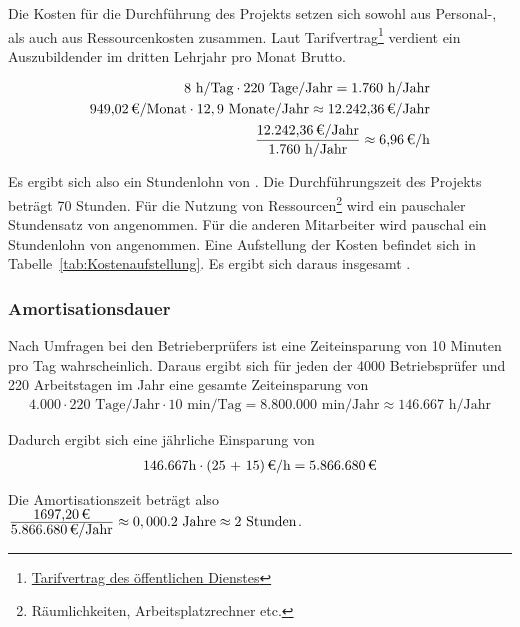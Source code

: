 Die Kosten für die Durchführung des Projekts setzen sich sowohl aus Personal-, als auch aus Ressourcenkosten zusammen.
Laut Tarifvertrag\footnote{\href{http://www.oeffentlichen-dienst.de/auszubildende/25-tarifvertrag-fuer-den-auszubildende/90-tvaoed-besonderer-teil-bbig.html}{Tarifvertrag des öffentlichen Dienstes}} verdient ein Auszubildender im dritten Lehrjahr pro Monat  Brutto. 

\begin{eqnarray}
8 \mbox{ h/Tag} \cdot 220 \mbox{ Tage/Jahr} = 1.760 \mbox{ h/Jahr}\\
\eur{949,02}\mbox{/Monat} \cdot 12,9 \mbox{ Monate/Jahr} \approx \eur{12.242,36} \mbox{/Jahr}\\
\frac{\eur{12.242,36} \mbox{/Jahr}}{1.760 \mbox{ h/Jahr}} \approx \eur{6,96}\mbox{/h}
\end{eqnarray}

Es ergibt sich also ein Stundenlohn von . 
Die Durchführungszeit des Projekts beträgt 70 Stunden. Für die Nutzung von Ressourcen\footnote{Räumlichkeiten, Arbeitsplatzrechner etc.} wird 
ein pauschaler Stundensatz von  angenommen. Für die anderen Mitarbeiter wird pauschal ein Stundenlohn von  angenommen. 
Eine Aufstellung der Kosten befindet sich in Tabelle~\ref{tab:Kostenaufstellung}. Es ergibt sich daraus insgesamt .


\subsubsection{Amortisationsdauer}
\label{sec:Amortisationsdauer}

Nach Umfragen bei den Betrieberprüfers ist eine Zeiteinsparung von 10 Minuten pro Tag wahrscheinlich. Daraus ergibt sich für jeden der 4000 Betriebsprüfer und 220 Arbeitstagen im Jahr eine gesamte Zeiteinsparung von 
\begin{eqnarray}
4.000 \cdot 220 \mbox{ Tage/Jahr} \cdot 10 \mbox{ min/Tag} = 8.800.000 \mbox{ min/Jahr} \approx 146.667 \mbox{ h/Jahr} 
\end{eqnarray}

Dadurch ergibt sich eine jährliche Einsparung von 
\begin{eqnarray}
146.667 \mbox{h} \cdot \eur{(25 + 15)}{\mbox{/h}} = \eur{5.866.680}
\end{eqnarray}

Die Amortisationszeit beträgt also $\frac{\eur{1697,20}}{\eur{5.866.680}\mbox{/Jahr}} \approx 0,000.2 \mbox{ Jahre} \approx 2 \mbox{ Stunden}$.

